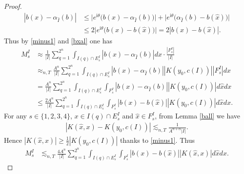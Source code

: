 \documentclass[oneside,english,a4wide]{amsart}
\numberwithin{equation}{section}
\numberwithin{figure}{section}
\theoremstyle{plain}
\theoremstyle{plain}
\theoremstyle{definition}
\theoremstyle{plain}
\theoremstyle{remark}
\theoremstyle{definition}
\theoremstyle{remark}
\theoremstyle{definition}
\newcommand{\8}{\infty}
\begin{document}
\begin{proof}
	\begin{equation}\label{bxal}
		\begin{aligned}
			|b(x)-\alpha_{\hat{I}}(b)|{}&\le \big|e^{\mathrm{i}{\theta}}\big(b(x)-\alpha_{\hat{I}}(b)\big)\big|+\big|e^{\mathrm{i}{\theta}}\big(\alpha_{\hat{I}}(b)-b(\hat{x})\big)\big|\\
			&\le 2\big|e^{\mathrm{i}{\theta}}\big(b(x)-b(\hat{x})\big)\big|
			= 2|b(x)-b(\hat{x})|.
		\end{aligned}
	\end{equation}
	Thus by \eqref{minus1} and \eqref{bxal} one has
	\begin{equation*}
		\begin{aligned}
			M_s^I{}&\approx \frac{1}{|I|}\sum_{q=1}^{2^n}\int_{I(q)\cap E_s^I} |b(x)-\alpha_{\hat{I}}(b)|dx \cdot \frac{|F_s^I|}{|I|}\\
			&\approx_{n,T} \frac{A^n}{|I|}\sum_{q=1}^{2^n}\int_{I(q)\cap E_s^I} |b(x)-\alpha_{\hat{I}}(b)||K(y_0,c(I))||F_s^I|dx\\
			&= \frac{A^n}{|I|}\sum_{q=1}^{2^n}\int_{I(q)\cap E_s^I}\int_{F_s^I} |b(x)-\alpha_{\hat{I}}(b)||K(y_0,c(I))|d\hat{x}dx\\
			&\le \frac{2A^n}{|I|}\sum_{q=1}^{2^n}\int_{I(q)\cap E_s^I}\int_{F_s^I} |b(x)-b(\hat{x})||K(y_0,c(I))|d\hat{x}dx.
		\end{aligned}
	\end{equation*}
	For any $s\in \{1,2,3,4\}$, $x\in I(q)\cap E_s^I$ and $\hat{x}\in F_s^I$, from Lemma \ref{ball} we have
	\begin{equation*}
		\begin{aligned}
			|K(\hat{x},x)-K(y_0,c(I))|\lesssim_{n,T}  \frac{1}{A^{n+\alpha}|I|}.
		\end{aligned}
	\end{equation*}
	Hence $|K(\hat{x},x)|\ge \frac{1}{2}|K(y_0,c(I))|$ thanks to \eqref{minus1}. Thus
	\begin{equation*}
		\begin{aligned}
			M_s^I{}&\lesssim_{n,T} \frac{4A^n}{|I|}\sum_{q=1}^{2^n}\int_{I(q)\cap E_s^I}\int_{F_s^I} |b(x)-b(\hat{x})||K(\hat{x},x)|d\hat{x}dx.
		\end{aligned}
	\end{equation*}

\end{proof}
\end{document}
